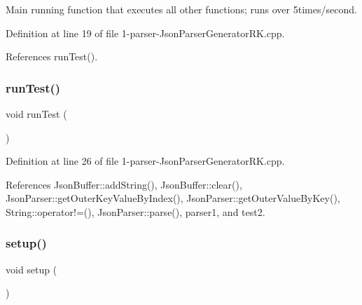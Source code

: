 Main running function that executes all other functions; runs over 5times/second. 



Definition at line 19 of file 1-\/parser-\/\+Json\+Parser\+Generator\+R\+K.\+cpp.



References run\+Test().

\mbox{\label{1-parser-_json_parser_generator_r_k_8cpp_a822f652c6fc2f163c182a6e5fe922c23}} 
\subsubsection{\texorpdfstring{run\+Test()}{runTest()}}
{\footnotesize\ttfamily void run\+Test (\begin{DoxyParamCaption}{ }\end{DoxyParamCaption})}



Definition at line 26 of file 1-\/parser-\/\+Json\+Parser\+Generator\+R\+K.\+cpp.



References Json\+Buffer\+::add\+String(), Json\+Buffer\+::clear(), Json\+Parser\+::get\+Outer\+Key\+Value\+By\+Index(), Json\+Parser\+::get\+Outer\+Value\+By\+Key(), String\+::operator!=(), Json\+Parser\+::parse(), parser1, and test2.

\mbox{\label{1-parser-_json_parser_generator_r_k_8cpp_a4fc01d736fe50cf5b977f755b675f11d}} 
\subsubsection{\texorpdfstring{setup()}{setup()}}
{\footnotesize\ttfamily void setup (\begin{DoxyParamCaption}{ }\end{DoxyParamCaption})}




